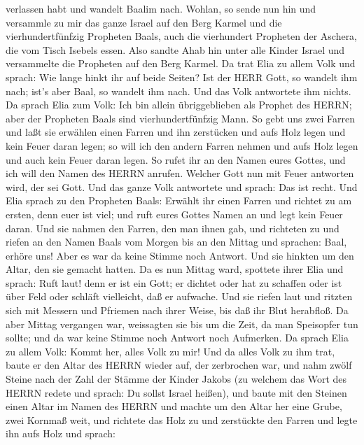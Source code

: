 verlassen habt und wandelt Baalim nach.  Wohlan, so sende
nun hin und versammle zu mir das ganze Israel auf den Berg Karmel und
die vierhundertfünfzig Propheten Baals, auch die vierhundert Propheten
der Aschera, die vom Tisch Isebels essen.  Also sandte Ahab
hin unter alle Kinder Israel und versammelte die Propheten auf den Berg
Karmel.  Da trat Elia zu allem Volk und sprach: Wie lange
hinkt ihr auf beide Seiten? Ist der HERR Gott, so wandelt ihm nach;
ist's aber Baal, so wandelt ihm nach. Und das Volk antwortete ihm
nichts.  Da sprach Elia zum Volk: Ich bin allein
übriggeblieben als Prophet des HERRN; aber der Propheten Baals sind
vierhundertfünfzig Mann.  So gebt uns zwei Farren und laßt
sie erwählen einen Farren und ihn zerstücken und aufs Holz legen und
kein Feuer daran legen; so will ich den andern Farren nehmen und aufs
Holz legen und auch kein Feuer daran legen.  So rufet ihr
an den Namen eures Gottes, und ich will den Namen des HERRN anrufen.
Welcher Gott nun mit Feuer antworten wird, der sei Gott. Und das ganze
Volk antwortete und sprach: Das ist recht.  Und Elia sprach
zu den Propheten Baals: Erwählt ihr einen Farren und richtet zu am
ersten, denn euer ist viel; und ruft eures Gottes Namen an und legt kein
Feuer daran.  Und sie nahmen den Farren, den man ihnen gab,
und richteten zu und riefen an den Namen Baals vom Morgen bis an den
Mittag und sprachen: Baal, erhöre uns! Aber es war da keine Stimme noch
Antwort. Und sie hinkten um den Altar, den sie gemacht hatten.
 Da es nun Mittag ward, spottete ihrer Elia und sprach:
Ruft laut! denn er ist ein Gott; er dichtet oder hat zu schaffen oder
ist über Feld oder schläft vielleicht, daß er aufwache. 
Und sie riefen laut und ritzten sich mit Messern und Pfriemen nach ihrer
Weise, bis daß ihr Blut herabfloß.  Da aber Mittag
vergangen war, weissagten sie bis um die Zeit, da man Speisopfer tun
sollte; und da war keine Stimme noch Antwort noch Aufmerken.
 Da sprach Elia zu allem Volk: Kommt her, alles Volk zu
mir! Und da alles Volk zu ihm trat, baute er den Altar des HERRN wieder
auf, der zerbrochen war,  und nahm zwölf Steine nach der
Zahl der Stämme der Kinder Jakobs (zu welchem das Wort des HERRN redete
und sprach: Du sollst Israel heißen),  und baute mit den
Steinen einen Altar im Namen des HERRN und machte um den Altar her eine
Grube, zwei Kornmaß weit,  und richtete das Holz zu und
zerstückte den Farren und legte ihn aufs Holz  und sprach:
